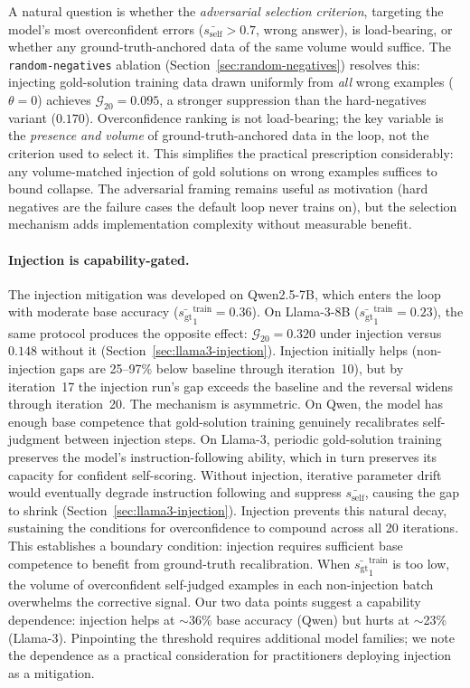 \documentclass{article}
\newcommand{\gap}{\mathcal{G}}          %
\newcommand{\self}{s_{\text{self}}}     %
\newcommand{\gt}{s_{\text{gt}}}         %
\begin{document}
A natural question is whether the \emph{adversarial selection criterion}, targeting
the model's most overconfident errors ($\bar{\self} > 0.7$, wrong answer), is
load-bearing, or whether any ground-truth-anchored data of the same volume would
suffice.
The \texttt{random-negatives} ablation (Section~\ref{sec:random-negatives})
resolves this: injecting gold-solution training data drawn uniformly from
\emph{all} wrong examples ($\theta = 0$) achieves $\gap_{20} = 0.095$,
a stronger suppression than the hard-negatives variant ($0.170$).
Overconfidence ranking is not load-bearing; the key variable is the
\emph{presence and volume} of ground-truth-anchored data in the loop, not the
criterion used to select it.
This simplifies the practical prescription considerably: any volume-matched
injection of gold solutions on wrong examples suffices to bound collapse.
The adversarial framing remains useful as motivation (hard negatives are
the failure cases the default loop never trains on), but the selection
mechanism adds implementation complexity without measurable benefit.

\paragraph{Injection is capability-gated.}
The injection mitigation was developed on Qwen2.5-7B, which enters the loop
with moderate base accuracy ($\bar{\gt}^\text{train}_1 = 0.36$).
On Llama-3-8B ($\bar{\gt}^\text{train}_1 = 0.23$), the same protocol produces
the opposite effect: $\gap_{20} = 0.320$ under injection versus $0.148$
without it (Section~\ref{sec:llama3-injection}).
Injection initially helps (non-injection gaps are 25--97\% below baseline
through iteration~10), but by iteration~17 the injection run's gap exceeds
the baseline and the reversal widens through iteration~20.
The mechanism is asymmetric.
On Qwen, the model has enough base competence that gold-solution training
genuinely recalibrates self-judgment between injection steps.
On Llama-3, periodic gold-solution training preserves the model's
instruction-following ability, which in turn preserves its capacity for
confident self-scoring.
Without injection, iterative parameter drift would eventually degrade instruction
following and suppress $\bar{\self}$, causing the gap to shrink
(Section~\ref{sec:llama3-injection}).
Injection prevents this natural decay, sustaining the conditions for
overconfidence to compound across all 20 iterations.
This establishes a boundary condition: injection requires sufficient base
competence to benefit from ground-truth recalibration.
When $\bar{\gt}^\text{train}_1$ is too low, the volume of overconfident
self-judged examples in each non-injection batch overwhelms the corrective
signal.
Our two data points suggest a capability dependence: injection helps at
$\sim$36\% base accuracy (Qwen) but hurts at $\sim$23\% (Llama-3).
Pinpointing the threshold requires additional model families; we note
the dependence as a practical consideration for practitioners deploying
injection as a mitigation.
\end{document}
